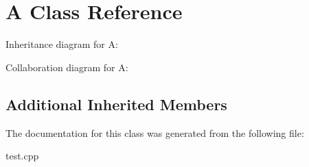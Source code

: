 \hypertarget{classA}{}\section{A Class Reference}
\label{classA}


Inheritance diagram for A\+:


Collaboration diagram for A\+:
\subsection*{Additional Inherited Members}


The documentation for this class was generated from the following file\+:\begin{DoxyCompactItemize}
\item 
test.\+cpp\end{DoxyCompactItemize}
